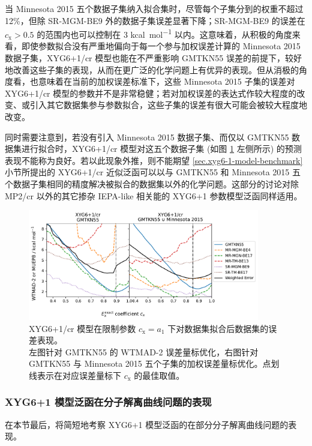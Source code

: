 当 Minnesota 2015 五个数据子集纳入拟合集时，尽管每个子集分到的权重不超过 12\%，但除 SR-MGM-BE9 外的数据子集误差显著下降；SR-MGM-BE9 的误差在 $c_\mathrm{x} > 0.5$ 的范围内也可以控制在 3 \si{kcal.mol^{-1}} 以内。这意味着，从积极的角度来看，即使参数拟合没有严重地偏向于每一个参与加权误差计算的 Minnesota 2015 数据子集，XYG6+1/cr 模型也能在不严重影响 GMTKN55 误差的前提下，较好地改善这些子集的表现，从而在更广泛的化学问题上有优异的表现。但从消极的角度看，也意味着在当前的加权误差标准下，这些 Minnesota 2015 子集的误差对 XYG6+1/cr 模型的参数并不是非常稳健；若对加权误差的表达式作较大程度的改变、或引入其它数据集参与参数拟合，这些子集的误差有很大可能会被较大程度地改变。

同时需要注意到，若没有引入 Minnesota 2015 数据子集、而仅以 GMTKN55 数据集进行拟合时，XYG6+1/cr 模型对这五个数据子集 (如图 \ref{fig.plot-seq-xyg7} 左侧所示) 的预测表现不能称为良好。若以此现象外推，则不能期望 \ref{sec.xyg6-1-model-benchmark} 小节所提出的 XYG6+1/cr 近似泛函可以以与 GMTKN55 和 Minnesota 2015 五个数据子集相同的精度解决被拟合的数据集以外的化学问题。这部分的讨论对除 MP2/cr 以外的其它掺杂 IEPA-like 相关能的 XYG6+1 参数模型泛函同样适用。

\begin{figure}[h]
  \centering
  \caption{XYG6+1/cr 模型在限制参数 $c_\mathrm{x} = a_1$ 下对数据集拟合后数据集的误差表现。\\左图针对 GMTKN55 的 WTMAD-2 误差量标优化，右图针对 GMTKN55 与 Minnesota 2015 五个子集的加权误差量标优化。点划线表示在对应误差量标下 $c_\mathrm{x}$ 的最佳取值。}
  \label{fig.plot-seq-xyg7}
  \includegraphics[width=0.9\textwidth]{assets/plot-seq-cr.pdf}
\end{figure}

\subsubsection{XYG6+1 模型泛函在分子解离曲线问题的表现}

在本节最后，将简短地考察 XYG6+1 模型泛函的在部分分子解离曲线问题的表现。

